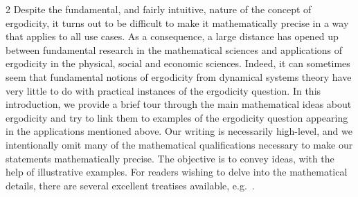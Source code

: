 \documentclass[11pt]{article}
\begin{document}
\begin{multicols}{2}
Despite the fundamental, and fairly intuitive, nature of the concept of ergodicity, it turns out to be difficult to make it mathematically precise in a way that applies to all use cases.
As a consequence, a large distance has opened up between fundamental research in the mathematical sciences and applications of ergodicity in the physical, social and economic sciences. 
Indeed, it can sometimes seem that fundamental notions of ergodicity from dynamical systems theory have very little to do with practical instances of the ergodicity question. 
In this introduction, we provide a brief tour through the main mathematical ideas about ergodicity and try to link them to examples of the ergodicity question appearing in the applications mentioned above. 
Our writing is necessarily high-level, and we intentionally omit many of the mathematical qualifications necessary to make our statements mathematically precise. 
The objective is to convey ideas, %
with the help of illustrative examples. 
For readers wishing to delve into the mathematical details,
there are several excellent treatises available, e.g.\ \cite{bakhtin2015topics,Petersen_1983,silva2008invitation,walters2000introduction}.


\end{multicols}
\end{document}
